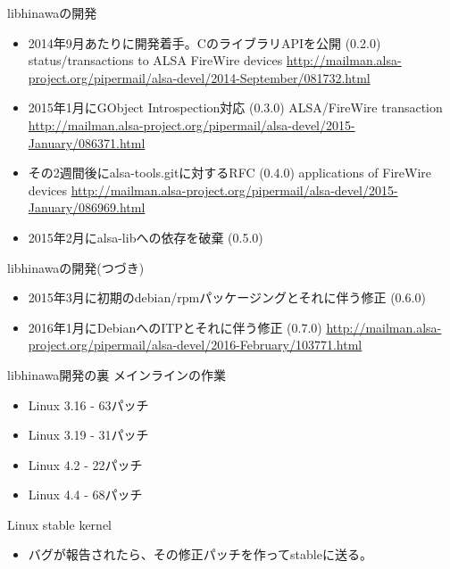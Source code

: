 \begin{frame}{libhinawaの開発}
  \begin{itemize}
  \item 2014年9月あたりに開発着手。CのライブラリAPIを公開 (0.2.0)
status/transactions to ALSA FireWire devices
\url{http://mailman.alsa-project.org/pipermail/alsa-devel/2014-September/081732.html}
  \item 2015年1月にGObject Introspection対応 (0.3.0)
ALSA/FireWire transaction
\url{http://mailman.alsa-project.org/pipermail/alsa-devel/2015-January/086371.html}
  \item その2週間後にalsa-tools.gitに対するRFC (0.4.0)
applications of FireWire devices
\url{http://mailman.alsa-project.org/pipermail/alsa-devel/2015-January/086969.html}
  \item 2015年2月にalsa-libへの依存を破棄 (0.5.0)
  \end{itemize}
\end{frame}

\begin{frame}{libhinawaの開発(つづき)}
  \begin{itemize}
  \item 2015年3月に初期のdebian/rpmパッケージングとそれに伴う修正 (0.6.0)
  \item 2016年1月にDebianへのITPとそれに伴う修正 (0.7.0)
\url{http://mailman.alsa-project.org/pipermail/alsa-devel/2016-February/103771.html}
  \end{itemize}
\end{frame}

\begin{frame}{libhinawa開発の裏}
  メインラインの作業
  \begin{itemize}
  \item Linux 3.16 - 63パッチ
  \item Linux 3.19 - 31パッチ
  \item Linux 4.2 - 22パッチ
  \item Linux 4.4 - 68パッチ
  \end{itemize}
  Linux stable kernel
  \begin{itemize}
  \item バグが報告されたら、その修正パッチを作ってstableに送る。
  \end{itemize}
\end{frame}

